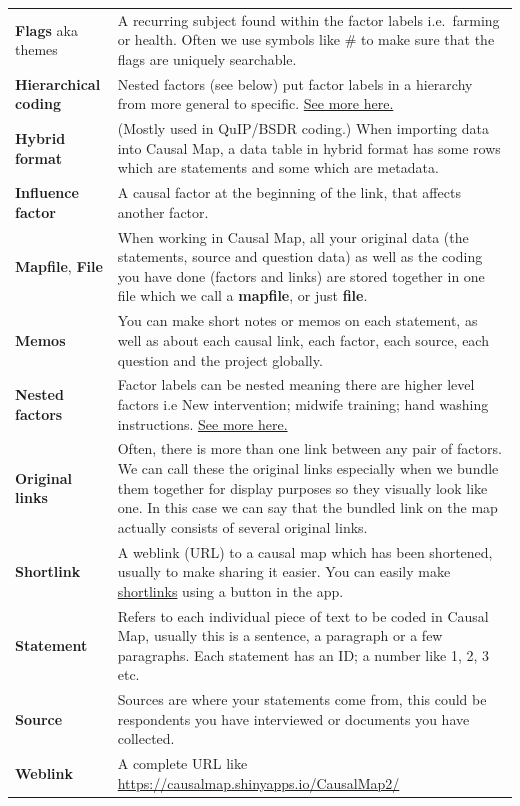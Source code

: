\documentclass[
]{book}
\begin{document}
\begin{longtable}[]{@{}
  >{\raggedright\arraybackslash}p{}
  >{\raggedright\arraybackslash}p{}@{}}
\textbf{Flags} aka themes & A recurring subject found within the factor labels i.e.~farming or health. Often we use symbols like \# to make sure that the flags are uniquely searchable. \\
\textbf{Hierarchical coding} & Nested factors (see below) put factor labels in a hierarchy from more general to specific. \protect\hyperlink{simplifying}{See more here.} \\
\textbf{Hybrid format} & (Mostly used in QuIP/BSDR coding.) When importing data into Causal Map, a data table in hybrid format has some rows which are statements and some which are metadata. \\
\textbf{Influence factor} & A causal factor at the beginning of the link, that affects another factor. \\
\textbf{Mapfile}, \textbf{File} & When working in Causal Map, all your original data (the statements, source and question data) as well as the coding you have done (factors and links) are stored together in one file which we call a \textbf{mapfile}, or just \textbf{file}. \\
\textbf{Memos} & You can make short notes or memos on each statement, as well as about each causal link, each factor, each source, each question and the project globally. \\
\textbf{Nested factors} & Factor labels can be nested meaning there are higher level factors i.e New intervention; midwife training; hand washing instructions. \protect\hyperlink{simplifying}{See more here.} \\
\textbf{Original links} & Often, there is more than one link between any pair of factors. We can call these the original links especially when we bundle them together for display purposes so they visually look like one. In this case we can say that the bundled link on the map actually consists of several original links. \\
\textbf{Shortlink} & A weblink (URL) to a causal map which has been shortened, usually to make sharing it easier. You can easily make \protect\hyperlink{xshortlinks}{shortlinks} using a button in the app. \\
\textbf{Statement} & Refers to each individual piece of text to be coded in Causal Map, usually this is a sentence, a paragraph or a few paragraphs. Each statement has an ID; a number like 1, 2, 3 etc. \\
\textbf{Source} & Sources are where your statements come from, this could be respondents you have interviewed or documents you have collected. \\
\textbf{Weblink} & A complete URL like \url{https://causalmap.shinyapps.io/CausalMap2/} \\
\bottomrule
\end{longtable}
\end{document}
